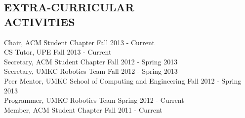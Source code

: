 \documentclass[line,margin]{res}
\begin{document}
\begin{resume}
\section{EXTRA-CURRICULAR \\ ACTIVITIES}             
		Chair, ACM Student Chapter \hfill Fall 2013 - Current \\
            	CS Tutor, UPE \hfill Fall 2013 - Current \\
		Secretary, ACM Student Chapter \hfill Fall 2012 - Spring 2013 \\	
		Secretary, UMKC Robotics Team \hfill  Fall 2012 - Spring 2013 \\	
		Peer Mentor, UMKC School of Computing and Engineering \hfill Fall 2012 - Spring 2013 \\	
		Programmer, UMKC Robotics Team \hfill Spring 2012 - Current \\
		Member, ACM Student Chapter \hfill Fall 2011 - Current 

\end{resume}
\end{document}
